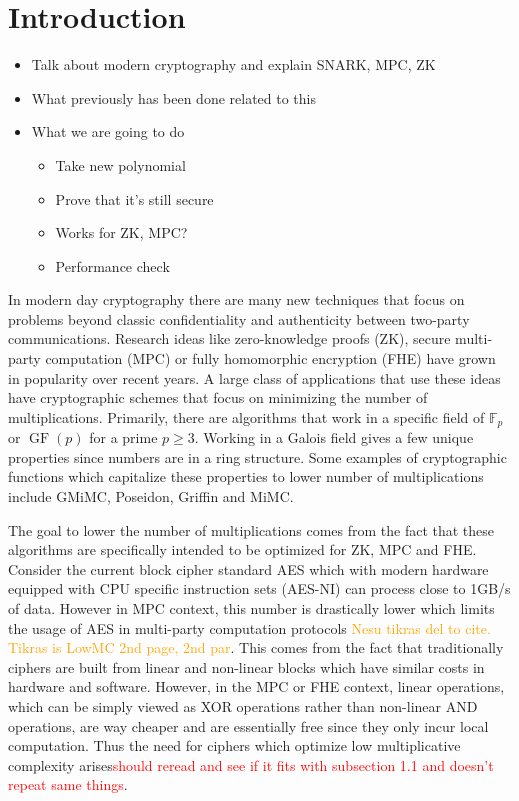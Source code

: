 \documentclass{Resources/UoBLab1}
\theoremstyle{definition}
\begin{document}
\section{Introduction}
\begin{itemize}
    \item Talk about modern cryptography and explain SNARK, MPC, ZK
   \item What previously has been done related to this
    \item What we are going to do
    \begin{itemize}
        \item Take new polynomial
        \item Prove that it's still secure
        \item Works for ZK, MPC?
        \item Performance check
    \end{itemize}
\end{itemize}
\vspace{15pt}
In modern day cryptography there are many new techniques that focus on problems beyond classic confidentiality and authenticity between two-party communications. Research ideas like zero-knowledge proofs (ZK), secure multi-party computation (MPC) or fully homomorphic encryption (FHE) have grown in popularity over recent years. A large class of applications that use these ideas have cryptographic schemes that focus on minimizing the number of multiplications. Primarily, there are algorithms that work in a specific field of $\mathbb{F}_p$ or $\operatorname{GF}(p)$ for a prime $p \geq 3$. Working in a Galois field gives a few unique properties since numbers are in a ring structure. Some examples of cryptographic functions which capitalize these properties to lower number of multiplications include GMiMC\cite{GMiMC}, Poseidon\cite{Poseidon}, Griffin\cite{Griffin} and MiMC\cite{MiMC}.

The goal to lower the number of multiplications comes from the fact that these algorithms are specifically intended to be optimized for ZK, MPC and FHE. Consider the current block cipher standard AES which with modern hardware equipped with CPU specific instruction sets (AES-NI) can process close to 1GB/s\cite{AESNI} of data. However in MPC context, this number is drastically lower which limits the usage of AES in multi-party computation protocols\cite{AESInMPC} \textcolor{orange}{Nesu tikras del to cite. Tikras is LowMC 2nd page, 2nd par}. This comes from the fact that traditionally ciphers are built from linear and non-linear blocks which have similar costs in hardware and software. However, in the MPC or FHE context, linear operations, which can be simply viewed as XOR operations rather than non-linear AND operations, are way cheaper and are essentially free since they only incur local computation. Thus the need for ciphers which optimize low multiplicative complexity arises\textcolor{red}{should reread and see if it fits with subsection 1.1 and doesn't repeat same things}.
\end{document}
